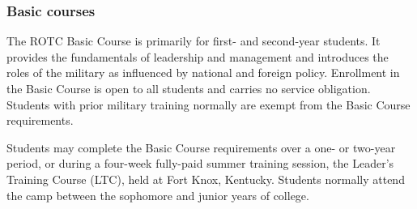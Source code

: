 \documentclass[
  letterpaper,
]{scrbook}
\begin{document}
\hypertarget{basic-courses}{%
\subsubsection*{Basic courses}\label{basic-courses}}

The ROTC Basic Course is primarily for first- and second-year students.
It provides the fundamentals of leadership and management and introduces
the roles of the military as influenced by national and foreign policy.
Enrollment in the Basic Course is open to all students and carries no
service obligation. Students with prior military training normally are
exempt from the Basic Course requirements.

Students may complete the Basic Course requirements over a one- or
two-year period, or during a four-week fully-paid summer training
session, the Leader's Training Course (LTC), held at Fort Knox,
Kentucky. Students normally attend the camp between the sophomore and
junior years of college.
\end{document}
